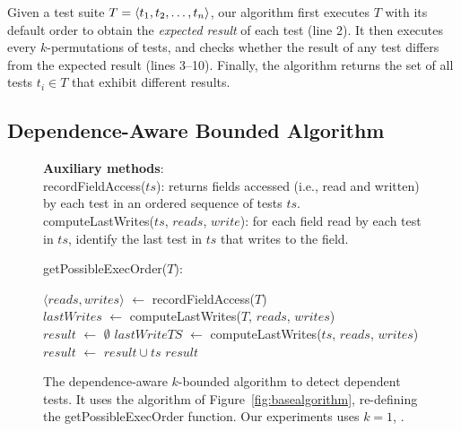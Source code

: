 Given a test suite $T =  \langle t_1, t_2, \ldots, t_n \rangle $, our algorithm
first executes $T$ with its default order
to obtain the \emph{expected result} of each test (line 2). 
It then executes every $k$-permutations of tests,
and checks whether the result of any test differs
from the expected result (lines 3--10). Finally, the algorithm returns the set
of all tests $t_i \in T$
that exhibit different results.





\subsection{Dependence-Aware Bounded Algorithm}
\label{sec:advalgorithm}

\begin{figure}[t]
\textbf{Auxiliary methods}:\\
recordFieldAccess($ts$): returns fields accessed (i.e., read and written) by each test in an ordered sequence of tests $ts$. \\
computeLastWrites($ts$, $reads$, $write$): for each field read by each test in $ts$, identify the last test in $ts$ that writes to the field.\\

\vspace{-2mm}

getPossibleExecOrder($T$):\\
\vspace{-5mm}
\begin{algorithmic}[1]
\STATE $\langle reads, writes\rangle$ $\leftarrow$ recordFieldAccess($T$)\\
\STATE $\mathit{lastWrites}$ $\leftarrow$ computeLastWrites($T$, $\mathit{reads}$, $\mathit{writes}$)
\\
\STATE $\mathit{result}$ $\leftarrow$ $\emptyset$
\STATE $\mathit{lastWriteTS}$ $\leftarrow$ computeLastWrites($ts$, $\mathit{reads}$, $\mathit{writes}$)
\vspace{-3mm}
\STATE $\mathit{result}$ $\leftarrow$ $\mathit{result} \cup \mathit{ts}$
\ENDIF
\ENDFOR
\RETURN $\mathit{result}$
\end{algorithmic}

\vspace{-3mm}
\caption {The dependence-aware $k$-bounded algorithm to detect dependent tests.
It uses the algorithm of Figure~\ref{fig:basealgorithm}, re-defining the
getPossibleExecOrder function.
Our experiments uses $k=1$, . } 
\label{fig:impralg}
\end{figure}

